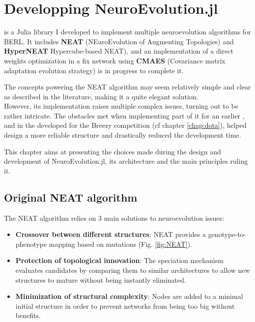 \chapter{Developping NeuroEvolution.jl}
\label{chap:neuroevo}

 is a Julia library I developed to implement multiple neuroevolution algorithms for BERL. It includes \textbf{NEAT} (NEuroEvolution of Augmenting Topologies) and \textbf{HyperNEAT} Hypercube-based NEAT), and an implementation of a direct weights optimization in a fix network using \textbf{CMAES} (Covariance matrix adaptation evolution strategy) is in progress to complete it. 

The concepts powering the NEAT algorithm may seem relatively simple and clear as described in the literature, making it a quite elegant solution. \\
However, its implementation raises multiple complex issues, turning out to be rather intricate. The obstacles met when implementing part of it for an earlier ,  and in the  developed for the Breezy competition (cf chapter \ref{chap:dota}), helped design a more reliable structure and drastically reduced the development time.

This chapter aims at presenting the choices made during the design and development of NeuroEvolution.jl, its architecture and the main principles ruling it. 

\section{Original NEAT algorithm}
\label{sec:og-neat}

The NEAT algorithm relies on 3 main solutions to neuroevolution issues:
\begin{itemize}
    \item \textbf{Crossover between different structures}: NEAT provides a genotype-to-phenotype mapping based on mutations (Fig. \ref{fig:NEAT}).
    \item \textbf{Protection of topological innovation}: The speciation mechanism evaluates candidates by comparing them to similar architectures to allow new structures to mature without being instantly eliminated. 
    \item \textbf{Minimization of structural complexity}: Nodes are added to a minimal initial structure in order to prevent networks from being too big without benefits.
\end{itemize}

